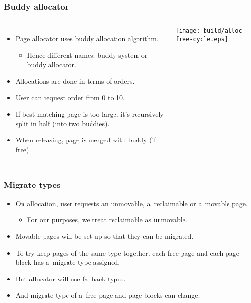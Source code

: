 \begin{frame}
  \frametitle{Buddy allocator}
  \begin{columns}[c]

    \begin{itemize}
    \item Page allocator uses buddy allocation algorithm.
      \begin{itemize}
      \item Hence different names: buddy system or buddy allocator.
      \end{itemize}
    \item Allocations are done in terms of orders.
    \item User can request order from 0 to 10.
    \item If best matching page is too large, it's recursively split
      in half (into two buddies).
    \item When releasing, page is merged with buddy (if free).
    \end{itemize}

    \begin{center}
    \texttt{[image: build/alloc-free-cycle.eps]}
    \end{center}
  \end{columns}
\end{frame}

\begin{frame}[fragile]
  \frametitle{Migrate types}

  \begin{itemize}
  \item On allocation, user requests an unmovable, a~reclaimable or
    a~movable page.
    \begin{itemize}
    \item For our purposes, we treat reclaimable as unmovable.
    \end{itemize}
  \item Movable pages will be set up so that they can be migrated.
  \end{itemize}

  \begin{itemize}
  \item To try keep pages of the same type together, each free page
    and each page block has a~migrate type assigned.
  \item But allocator will use fallback types.
  \item And migrate type of a~free page and page blocks can change.
  \end{itemize}
\end{frame}
